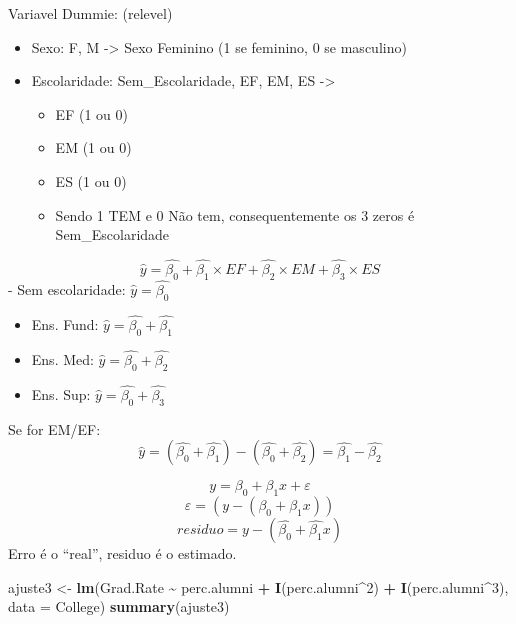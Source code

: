 \documentclass[
]{article}
\newenvironment{Shaded}{\begin{snugshade}}{\end{snugshade}}
\newcommand{\AttributeTok}[1]{\textcolor[rgb]{0.13,0.29,0.53}{#1}}
\newcommand{\DecValTok}[1]{\textcolor[rgb]{0.00,0.00,0.81}{#1}}
\newcommand{\FunctionTok}[1]{\textcolor[rgb]{0.13,0.29,0.53}{\textbf{#1}}}
\newcommand{\NormalTok}[1]{#1}
\newcommand{\OtherTok}[1]{\textcolor[rgb]{0.56,0.35,0.01}{#1}}
\newcommand{\SpecialCharTok}[1]{\textcolor[rgb]{0.81,0.36,0.00}{\textbf{#1}}}
\providecommand{\tightlist}{%
  \setlength{\itemsep}{0pt}\setlength{\parskip}{0pt}}
\begin{document}
Variavel Dummie: (relevel)

\begin{itemize}
\item
  Sexo: F, M -\textgreater{} Sexo Feminino (1 se feminino, 0 se
  masculino)
\item
  Escolaridade: Sem\_Escolaridade, EF, EM, ES -\textgreater{}

  \begin{itemize}
  \tightlist
  \item
    EF (1 ou 0)
  \item
    EM (1 ou 0)
  \item
    ES (1 ou 0)
  \item
    Sendo 1 TEM e 0 Não tem, consequentemente os 3 zeros é
    Sem\_Escolaridade
  \end{itemize}
\end{itemize}

\[
\hat{y} = \hat{\beta_0} + \hat{\beta_1} \times EF + \hat{\beta_2} \times EM + \hat{\beta_3} \times ES
\] - Sem escolaridade: \(\hat{y} = \hat{\beta_0}\)

\begin{itemize}
\item
  Ens. Fund: \(\hat{y} = \hat{\beta_0} + \hat{\beta_1}\)
\item
  Ens. Med: \(\hat{y} = \hat{\beta_0} + \hat{\beta_2}\)
\item
  Ens. Sup: \(\hat{y} = \hat{\beta_0} + \hat{\beta_3}\)
\end{itemize}

Se for EM/EF: \[
\hat{y} = (\hat{\beta_0} + \hat{\beta_1}) - (\hat{\beta_0} + \hat{\beta_2}) = \hat{\beta_1} - \hat{\beta_2}
\]

\[
y = \beta_0 + \beta_1 x + \varepsilon
\] \[
\varepsilon = (y - (\beta_0 + \beta_1 x))
\] \[
residuo = y - (\hat{\beta_0} + \hat{ \beta_1 } x)
\] Erro é o ``real'', residuo é o estimado.

\begin{Shaded}
\begin{Highlighting}[]
\NormalTok{ajuste3 }\OtherTok{\textless{}{-}} \FunctionTok{lm}\NormalTok{(Grad.Rate }\SpecialCharTok{\textasciitilde{}}\NormalTok{ perc.alumni }\SpecialCharTok{+} \FunctionTok{I}\NormalTok{(perc.alumni}\SpecialCharTok{\^{}}\DecValTok{2}\NormalTok{) }\SpecialCharTok{+} \FunctionTok{I}\NormalTok{(perc.alumni}\SpecialCharTok{\^{}}\DecValTok{3}\NormalTok{), }\AttributeTok{data =}\NormalTok{ College)}
\FunctionTok{summary}\NormalTok{(ajuste3)}
\end{Highlighting}
\end{Shaded}
\end{document}
